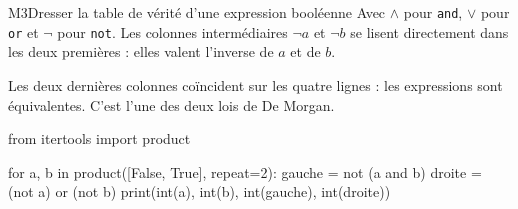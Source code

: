 \begin{fichemethode}{M3}{Dresser la table de vérité d'une expression booléenne}
\medskip
Avec $\wedge$ pour \texttt{and}, $\vee$ pour \texttt{or} et $\neg$ pour \texttt{not}.
Les colonnes intermédiaires $\neg a$ et $\neg b$ se lisent directement dans les
deux premières : elles valent l'inverse de $a$ et de $b$.

Les deux dernières colonnes coïncident sur les quatre lignes : les expressions sont
équivalentes. C'est l'une des deux lois de De Morgan.

\begin{python}
from itertools import product

for a, b in product([False, True], repeat=2):
    gauche = not (a and b)
    droite = (not a) or (not b)
    print(int(a), int(b), int(gauche), int(droite))
\end{python}



\end{fichemethode}
